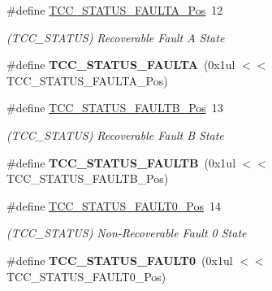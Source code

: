 \begin{DoxyCompactItemize}
\item 
\hypertarget{group___s_a_m_l21___t_c_c_ga2c51beb84a4ba2b19eb04caefb02f761}{}\#define \hyperlink{group___s_a_m_l21___t_c_c_ga2c51beb84a4ba2b19eb04caefb02f761}{T\+C\+C\+\_\+\+S\+T\+A\+T\+U\+S\+\_\+\+F\+A\+U\+L\+T\+A\+\_\+\+Pos}~12\label{group___s_a_m_l21___t_c_c_ga2c51beb84a4ba2b19eb04caefb02f761}

\begin{DoxyCompactList}\small\item\em (T\+C\+C\+\_\+\+S\+T\+A\+T\+U\+S) Recoverable Fault A State \end{DoxyCompactList}\item 
\hypertarget{group___s_a_m_l21___t_c_c_ga205b541f660a6bbde386d496a29ee76b}{}\#define {\bfseries T\+C\+C\+\_\+\+S\+T\+A\+T\+U\+S\+\_\+\+F\+A\+U\+L\+T\+A}~(0x1ul $<$$<$ T\+C\+C\+\_\+\+S\+T\+A\+T\+U\+S\+\_\+\+F\+A\+U\+L\+T\+A\+\_\+\+Pos)\label{group___s_a_m_l21___t_c_c_ga205b541f660a6bbde386d496a29ee76b}

\item 
\hypertarget{group___s_a_m_l21___t_c_c_gaa7365da12ce366258ffcf9aa54808a58}{}\#define \hyperlink{group___s_a_m_l21___t_c_c_gaa7365da12ce366258ffcf9aa54808a58}{T\+C\+C\+\_\+\+S\+T\+A\+T\+U\+S\+\_\+\+F\+A\+U\+L\+T\+B\+\_\+\+Pos}~13\label{group___s_a_m_l21___t_c_c_gaa7365da12ce366258ffcf9aa54808a58}

\begin{DoxyCompactList}\small\item\em (T\+C\+C\+\_\+\+S\+T\+A\+T\+U\+S) Recoverable Fault B State \end{DoxyCompactList}\item 
\hypertarget{group___s_a_m_l21___t_c_c_ga8955c3daa8755903235d2f8888c922e9}{}\#define {\bfseries T\+C\+C\+\_\+\+S\+T\+A\+T\+U\+S\+\_\+\+F\+A\+U\+L\+T\+B}~(0x1ul $<$$<$ T\+C\+C\+\_\+\+S\+T\+A\+T\+U\+S\+\_\+\+F\+A\+U\+L\+T\+B\+\_\+\+Pos)\label{group___s_a_m_l21___t_c_c_ga8955c3daa8755903235d2f8888c922e9}

\item 
\hypertarget{group___s_a_m_l21___t_c_c_gadc11f8d4c969a065cc98d6b540f9e348}{}\#define \hyperlink{group___s_a_m_l21___t_c_c_gadc11f8d4c969a065cc98d6b540f9e348}{T\+C\+C\+\_\+\+S\+T\+A\+T\+U\+S\+\_\+\+F\+A\+U\+L\+T0\+\_\+\+Pos}~14\label{group___s_a_m_l21___t_c_c_gadc11f8d4c969a065cc98d6b540f9e348}

\begin{DoxyCompactList}\small\item\em (T\+C\+C\+\_\+\+S\+T\+A\+T\+U\+S) Non-\/\+Recoverable Fault 0 State \end{DoxyCompactList}\item 
\hypertarget{group___s_a_m_l21___t_c_c_ga4c7f6c3781dfc044b4ea546b04267c37}{}\#define {\bfseries T\+C\+C\+\_\+\+S\+T\+A\+T\+U\+S\+\_\+\+F\+A\+U\+L\+T0}~(0x1ul $<$$<$ T\+C\+C\+\_\+\+S\+T\+A\+T\+U\+S\+\_\+\+F\+A\+U\+L\+T0\+\_\+\+Pos)\label{group___s_a_m_l21___t_c_c_ga4c7f6c3781dfc044b4ea546b04267c37}


\end{DoxyCompactItemize}
